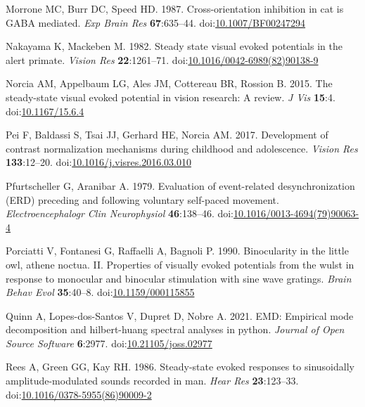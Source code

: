 \documentclass[]{article}
\begin{document}
\leavevmode\hypertarget{ref-Morrone1987}{}%
Morrone MC, Burr DC, Speed HD. 1987. Cross-orientation inhibition in cat is GABA mediated. \emph{Exp Brain Res} \textbf{67}:635--44. doi:\href{https://doi.org/10.1007/BF00247294}{10.1007/BF00247294}

\leavevmode\hypertarget{ref-Nakayama1982}{}%
Nakayama K, Mackeben M. 1982. Steady state visual evoked potentials in the alert primate. \emph{Vision Res} \textbf{22}:1261--71. doi:\href{https://doi.org/10.1016/0042-6989(82)90138-9}{10.1016/0042-6989(82)90138-9}

\leavevmode\hypertarget{ref-Norcia2015}{}%
Norcia AM, Appelbaum LG, Ales JM, Cottereau BR, Rossion B. 2015. The steady-state visual evoked potential in vision research: A review. \emph{J Vis} \textbf{15}:4. doi:\href{https://doi.org/10.1167/15.6.4}{10.1167/15.6.4}

\leavevmode\hypertarget{ref-Pei2017}{}%
Pei F, Baldassi S, Tsai JJ, Gerhard HE, Norcia AM. 2017. Development of contrast normalization mechanisms during childhood and adolescence. \emph{Vision Res} \textbf{133}:12--20. doi:\href{https://doi.org/10.1016/j.visres.2016.03.010}{10.1016/j.visres.2016.03.010}

\leavevmode\hypertarget{ref-Pfurtscheller1979}{}%
Pfurtscheller G, Aranibar A. 1979. Evaluation of event-related desynchronization (ERD) preceding and following voluntary self-paced movement. \emph{Electroencephalogr Clin Neurophysiol} \textbf{46}:138--46. doi:\href{https://doi.org/10.1016/0013-4694(79)90063-4}{10.1016/0013-4694(79)90063-4}

\leavevmode\hypertarget{ref-Porciatti1990}{}%
Porciatti V, Fontanesi G, Raffaelli A, Bagnoli P. 1990. Binocularity in the little owl, athene noctua. II. Properties of visually evoked potentials from the wulst in response to monocular and binocular stimulation with sine wave gratings. \emph{Brain Behav Evol} \textbf{35}:40--8. doi:\href{https://doi.org/10.1159/000115855}{10.1159/000115855}

\leavevmode\hypertarget{ref-Quinn2021}{}%
Quinn A, Lopes-dos-Santos V, Dupret D, Nobre A. 2021. EMD: Empirical mode decomposition and hilbert-huang spectral analyses in python. \emph{Journal of Open Source Software} \textbf{6}:2977. doi:\href{https://doi.org/10.21105/joss.02977}{10.21105/joss.02977}

\leavevmode\hypertarget{ref-Rees1986}{}%
Rees A, Green GG, Kay RH. 1986. Steady-state evoked responses to sinusoidally amplitude-modulated sounds recorded in man. \emph{Hear Res} \textbf{23}:123--33. doi:\href{https://doi.org/10.1016/0378-5955(86)90009-2}{10.1016/0378-5955(86)90009-2}
\end{document}
